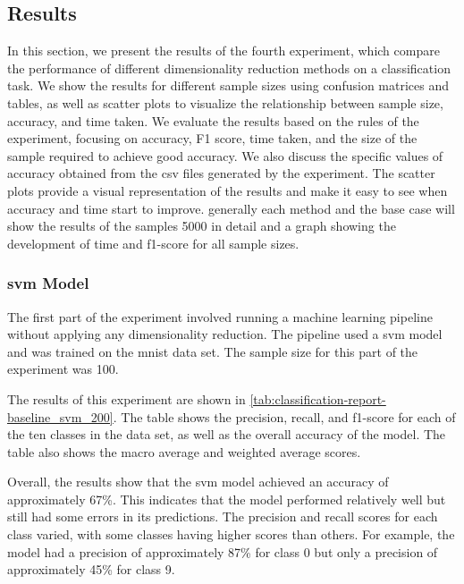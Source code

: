 \subsection{Results}\label{subsec:experiment_4_results}
In this section, we present the results of the fourth experiment, which compare the performance of different dimensionality reduction methods on a classification task. We show the results for different sample sizes using confusion matrices and tables, as well as scatter plots to visualize the relationship between sample size, accuracy, and time taken. We evaluate the results based on the rules of the experiment, focusing on accuracy, F1 score, time taken, and the size of the sample required to achieve good accuracy. We also discuss the specific values of accuracy obtained from the csv files generated by the experiment. The scatter plots provide a visual representation of the results and make it easy to see when accuracy and time start to improve. generally each method and the base case will show the results of the samples  5000 in detail and a graph showing the development of time and f1-score for all sample sizes.

\subsubsection{\gls{svm} Model}\label{subsubsec:experiment_4_no_dimmensionality_reduction}





The first part of the experiment involved running a machine learning pipeline without applying any dimensionality reduction. The pipeline used a \gls{svm} model and was trained on the \gls{mnist} data set. The sample size for this part of the experiment was 100.

The results of this experiment are shown in \ref{tab:classification-report-baseline_svm_200}. The table shows the precision, recall, and f1-score for each of the ten classes in the data set, as well as the overall accuracy of the model. The table also shows the macro average and weighted average scores.

Overall, the results show that the \gls{svm} model achieved an accuracy of approximately 67\%. This indicates that the model performed relatively well but still had some errors in its predictions. The precision and recall scores for each class varied, with some classes having higher scores than others. For example, the model had a precision of approximately 87\% for class 0 but only a precision of approximately 45\% for class 9. 

